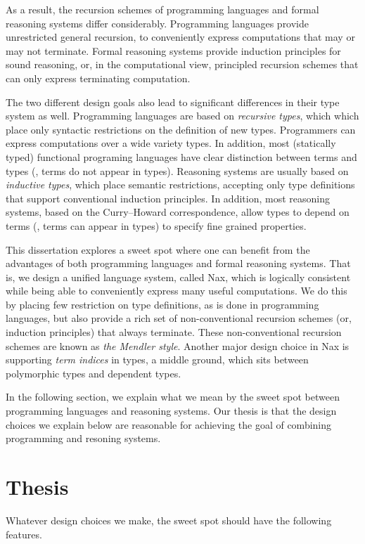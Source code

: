 As a result, the recursion schemes of programming languages and
formal reasoning systems differ considerably.
Programming languages provide unrestricted general recursion,
to conveniently express computations
that may or may not terminate.
Formal reasoning systems provide induction principles for sound reasoning,
or, in the computational view, principled recursion schemes
that can only express terminating computation.

The two different design goals also lead to significant differences
in their type system as well.
Programming languages are based on \emph{recursive types},
which which place only syntactic restrictions on the definition of new types.
Programmers can express computations over a wide variety types.
In addition, most (statically typed) functional programing languages have
clear distinction between terms and types (\ie, terms do not appear in types).
Reasoning systems are usually based on \emph{inductive types},
which place semantic restrictions, accepting only type definitions that support
conventional induction principles.
In addition, most reasoning systems, based on the Curry--Howard correspondence,
allow types to depend on terms (\ie, terms can appear in types) to specify
fine grained properties.

This dissertation explores a sweet spot where one can benefit from
the advantages of both programming languages and formal reasoning systems.
That is, we design a unified language system, called Nax, which is
logically consistent while being able to conveniently express
many useful computations. We do this by placing few restriction on type definitions,
as is done in programming languages, but also provide a rich set of
non-conventional recursion schemes (or, induction principles) that
always terminate. These non-conventional recursion schemes are known as
\emph{the Mendler style}. Another major design choice in Nax is
supporting \emph{term indices} in types, a middle ground, which sits between
polymorphic types and dependent types.

In the following section, we explain what we mean by the sweet spot between programming languages
and reasoning systems. Our thesis is that the design choices we explain below
are reasonable for achieving the goal of combining programming and resoning systems.

\section{Thesis}\label{sec:intro:thesis}
Whatever design choices we make, the sweet spot should have the following features.

